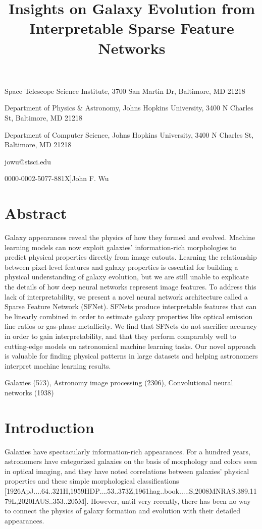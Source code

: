 \documentclass[11pt,a4paper]{article}
\title{Insights on Galaxy Evolution from Interpretable Sparse Feature Networks}
\begin{document}
\maketitle

Space Telescope Science Institute, 3700 San Martin Dr, Baltimore, MD 21218

Department of Physics \& Astronomy, Johns Hopkins University, 3400 N Charles St, Baltimore, MD 21218

Department of Computer Science, Johns Hopkins University, 3400 N Charles St, Baltimore, MD 21218

jowu@stsci.edu

0000-0002-5077-881X]John F. Wu

\section{Abstract}

Galaxy appearances reveal the physics of how they formed and evolved. Machine learning models can now exploit galaxies' information-rich morphologies to predict physical properties directly from image cutouts. Learning the relationship between pixel-level features and galaxy properties is essential for building a physical understanding of galaxy evolution, but we are still unable to explicate the details of how deep neural networks represent image features. To address this lack of interpretability, we present a novel neural network architecture called a Sparse Feature Network (SFNet). SFNets produce interpretable features that can be linearly combined in order to estimate galaxy properties like optical emission line ratios or gas-phase metallicity. We find that SFNets do not sacrifice accuracy in order to gain interpretability, and that they perform comparably well to cutting-edge models on astronomical machine learning tasks. Our novel approach is valuable for finding physical patterns in large datasets and helping astronomers interpret machine learning results.

Galaxies (573), Astronomy image processing (2306), Convolutional neural networks (1938)

\section{Introduction}

Galaxies have spectacularly information-rich appearances. For a hundred years, astronomers have categorized galaxies on the basis of morphology and colors seen in optical imaging, and they have noted correlations between galaxies' physical properties and these simple morphological classifications [1926ApJ....64..321H,1959HDP....53..373Z,1961hag..book.....S,2008MNRAS.389.1179L,2020IAUS..353..205M]. However, until very recently, there has been no way to connect the physics of galaxy formation and evolution with their detailed appearances.
\end{document}
